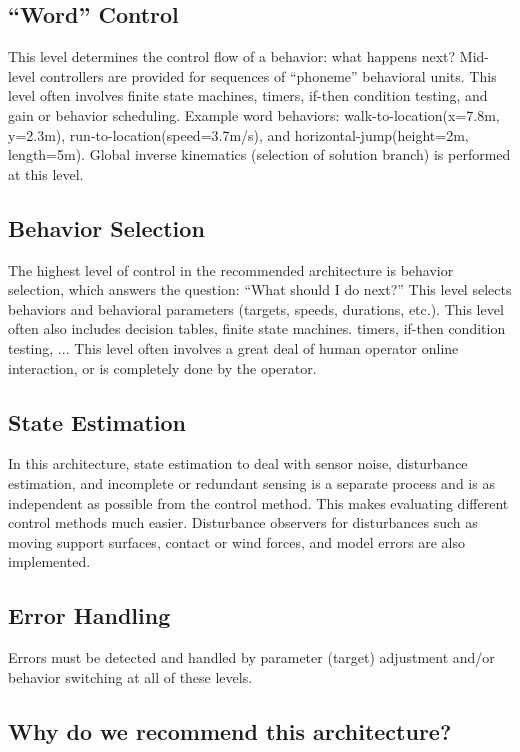 \documentclass[letterpaper,12pt,fullpage]{article}
\begin{document}
\subsection{``Word'' Control}

This level determines the control flow of a behavior: what happens next?
Mid-level controllers are provided for sequences of ``phoneme'' behavioral
units.
This level often involves finite state machines, timers, if-then condition testing,
and gain or behavior
scheduling.
Example word behaviors: walk-to-location(x=7.8m, y=2.3m), run-to-location(speed=3.7m/s),
and horizontal-jump(height=2m, length=5m).
Global inverse kinematics (selection of solution branch) is performed at this level.

\subsection{Behavior Selection}

The highest level of control in the recommended architecture is behavior selection,
which answers the question:
``What should I do next?''
This level selects behaviors and behavioral parameters (targets,
speeds, durations, etc.).
This level often also 
includes decision tables, finite state machines. timers, if-then condition testing, ...
This level often involves a great deal of human operator online interaction,
or is completely done by the operator.

\subsection{State Estimation}

In this architecture, state estimation to deal with sensor noise,
disturbance estimation, and incomplete or
redundant sensing is a separate process and is as independent as possible
from the control method.
This makes evaluating different control methods much easier.
Disturbance observers for disturbances such as
moving support surfaces, contact or wind forces, and model errors
are also implemented.

\subsection{Error Handling}

Errors must be detected and handled by parameter (target)
adjustment and/or behavior switching
at all of these levels.

\subsection{Why do we recommend this architecture?}
\end{document}
